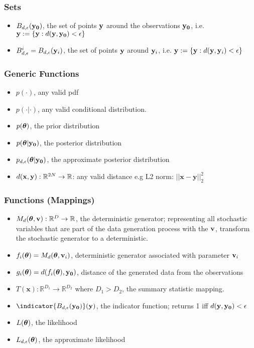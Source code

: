 \subsubsection*{Sets}
\label{sec:sets}

\begin{itemize}
\item $B_{d,\epsilon}(\mathbf{y_0})$, the set of points $\mathbf{y}$ around the observations
  $\mathbf{y_0}$, i.e. $\mathbf{y} := \{\mathbf{y}: d(\mathbf{y}, \mathbf{y_0}) < \epsilon \}$
\item $B_{d,\epsilon}^i = B_{d,\epsilon}(\mathbf{y}_i)$, the set of points $\mathbf{y}$ around
  $\mathbf{y}_i$, i.e. $\mathbf{y} := \{\mathbf{y}: d(\mathbf{y}, \mathbf{y}_i) < \epsilon \}$
\end{itemize}
    
\subsubsection*{Generic Functions}
\label{sec:generic-functions}

\begin{itemize}
\item $p(\cdot)$, any valid pdf
\item $p(\cdot | \cdot)$, any valid conditional distribution.
\item $p(\boldsymbol{\theta})$, the prior distribution
\item $p(\boldsymbol{\theta}|\mathbf{y_0})$, the posterior distribution
\item $p_{d,\epsilon}(\boldsymbol{\theta}|\mathbf{y_0})$, the approximate posterior
  distribution  
\item $d(\mathbf{x}, \mathbf{y}): \mathbb{R}^{2N} \rightarrow \mathbb{R}$: any valid
  distance e.g L2 norm: $||\mathbf{x}-\mathbf{y}||_2^2$
\end{itemize}

\subsubsection*{Functions (Mappings)}
\label{sec:functions-mappings}

\begin{itemize}
\item $M_d(\boldsymbol{\theta}, \mathbf{v}): \mathbb{R}^D \rightarrow \mathbb{R}$, the deterministic
  generator; representing all stochastic variables that
  are part of the data generation process with the  $\mathbf{v}$, transform the stochastic generator to a deterministic.
\item $f_i(\boldsymbol{\theta}) = M_d(\boldsymbol{\theta}, \mathbf{v}_i)$, deterministic generator associated with parameter $\mathbf{v}_i$
\item $g_i(\boldsymbol{\theta}) = d(f_i(\boldsymbol{\theta}), \mathbf{y_0})$, distance of the generated data from the observations
\item $T(\mathbf{x}): \mathbb{R}^{D_1} \rightarrow \mathbb{R}^{D_2}$
  where $D_1 > D_2$, the summary statistic mapping.
\item $\indicator{\region(\data)}(\yb)$, the indicator function; returns 1 iff $d(\mathbf{y}, \mathbf{y_0})<\epsilon$
\item $L(\boldsymbol{\theta})$, the likelihood
\item $L_{d,\epsilon}(\boldsymbol{\theta})$, the approximate likelihood
\end{itemize}
